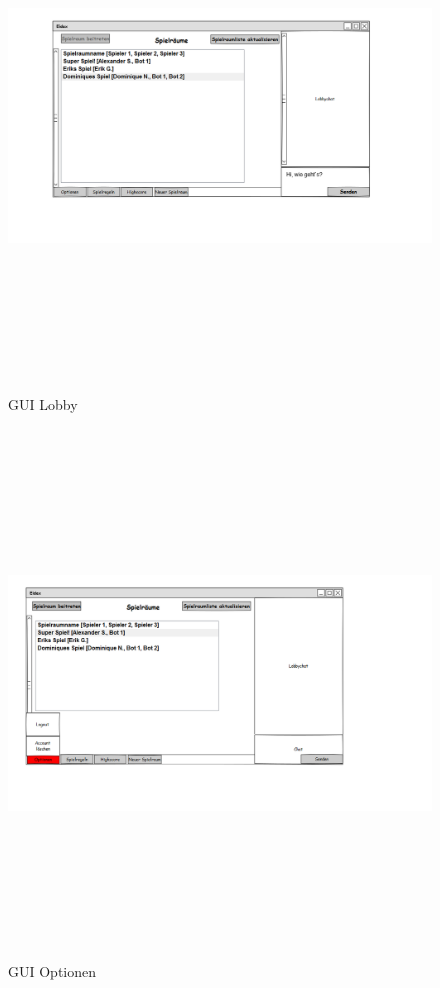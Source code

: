 \begin{center}
	\begin{figure}
		\hspace*{-2cm}
		\includegraphics[width=170mm, height =140mm]{PencilProjectData/lobby2}
		\caption{GUI Lobby}
	\end{figure}
	
	\begin{figure}
		\hspace*{-1cm}
		\includegraphics[width=170mm, height =140mm]{PencilProjectData/optionen}
		\caption{GUI Optionen}
	\end{figure}
	

\end{center}
